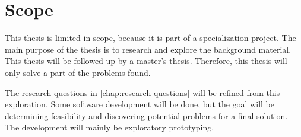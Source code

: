 \section{Scope}

This thesis is limited in scope, because it is part of a specialization project.
The main purpose of the thesis is to research and explore the background material. 
This thesis will be followed up by a master's thesis.
Therefore, this thesis will only solve a part of the problems found.

The research questions in \cref{chap:research-questions} will be refined from this exploration.
Some software development will be done, but the goal will be determining feasibility and discovering potential problems for a final solution.
The development will mainly be exploratory prototyping.
